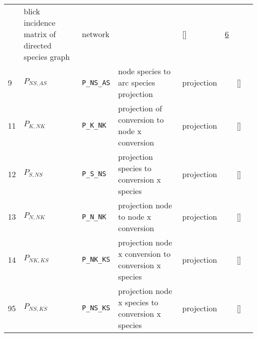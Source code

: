 \begin{longtable}{|p{1cm}|p{3cm}|p{3cm}|p{7cm}|p{3.0cm}|p{3cm}|p{2cm}|p{1cm}|}
             & blick incidence matrix of directed species graph
             & \begin{lay}network \end{lay}
             & $  $
             & []
             & \hyperlink{"e:6"}{ 6 }
                 \\
    9
             & \hypertarget{"v:9"}{ $ {P}{_{{N S}, {A S}}} $}
             & \verb|P_NS_AS|
             & node species to arc species projection
             & \begin{lay}projection \end{lay}
             & $  $
             & []
             & \\
    11
             & \hypertarget{"v:11"}{ $ {P}{_{K, {N K}}} $}
             & \verb|P_K_NK|
             & projection of conversion to node x conversion
             & \begin{lay}projection \end{lay}
             & $  $
             & []
             & \\
    12
             & \hypertarget{"v:12"}{ $ {P}{_{S, {N S}}} $}
             & \verb|P_S_NS|
             & projection species to conversion x
species
             & \begin{lay}projection \end{lay}
             & $  $
             & []
             & \\
    13
             & \hypertarget{"v:13"}{ $ {P}{_{N, {N K}}} $}
             & \verb|P_N_NK|
             & projection node to node x conversion
             & \begin{lay}projection \end{lay}
             & $  $
             & []
             & \\
    14
             & \hypertarget{"v:14"}{ $ {P}{_{{N K}, {K S}}} $}
             & \verb|P_NK_KS|
             & projection node x conversion to conversion x
species
             & \begin{lay}projection \end{lay}
             & $  $
             & []
             & \\
    95
             & \hypertarget{"v:95"}{ $ {P}{_{{N S}, {K S}}} $}
             & \verb|P_NS_KS|
             & projection node x species to conversion x
species
             & \begin{lay}projection \end{lay}
             & $  $
             & []
             & \\

\end{longtable}
